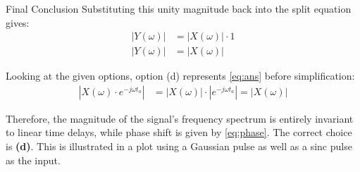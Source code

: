 \documentclass{beamer}
\theoremstyle{remark}
\providecommand{\abs}[1]{\left\vert#1\right\vert}
\numberwithin{equation}{section}
\begin{document}
\begin{frame}{Final Conclusion}
Substituting this unity magnitude back into the split equation gives:
\begin{align}
    \abs{Y(\omega)} &= \abs{X(\omega)} \cdot 1 \\
    \abs{Y(\omega)} &= \abs{X(\omega)}
\end{align}

Looking at the given options, option (d) represents \eqref{eq:ans} before simplification:
\begin{align}
    \abs{X(\omega) \cdot e^{-j\omega t_a}} &= \abs{X(\omega)} \cdot \abs{e^{-j\omega t_a}} = \abs{X(\omega)}
\end{align}

Therefore, the magnitude of the signal's frequency spectrum is entirely invariant to linear time delays, while phase shift is given by \eqref{eq:phase}. The correct choice is \textbf{(d)}. This is illustrated in a plot using a Gaussian pulse as well as a sinc pulse as the input.
\end{frame}

\end{document}
